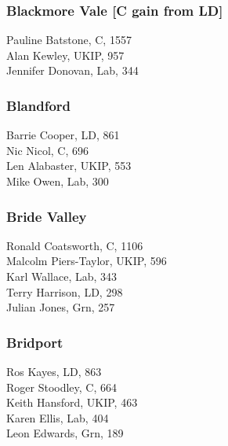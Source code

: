 \documentclass[a4paper,openany,10pt]{book}
\begin{document}
\subsubsection*{Blackmore Vale \hspace*{\fill}\nolinebreak[1]%
\enspace\hspace*{\fill}
[C gain from LD]}



Pauline Batstone, C, 1557\\
Alan Kewley, UKIP, 957\\
Jennifer Donovan, Lab, 344\\


\subsubsection*{Blandford}



Barrie Cooper, LD, 861\\
Nic Nicol, C, 696\\
Len Alabaster, UKIP, 553\\
Mike Owen, Lab, 300\\


\subsubsection*{Bride Valley}



Ronald Coatsworth, C, 1106\\
Malcolm Piers-Taylor, UKIP, 596\\
Karl Wallace, Lab, 343\\
Terry Harrison, LD, 298\\
Julian Jones, Grn, 257\\


\subsubsection*{Bridport}



Ros Kayes, LD, 863\\
Roger Stoodley, C, 664\\
Keith Hansford, UKIP, 463\\
Karen Ellis, Lab, 404\\
Leon Edwards, Grn, 189\\
\end{document}
